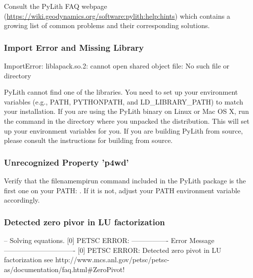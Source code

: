 Consult the PyLith FAQ webpage (\url{https://wiki.geodynamics.org/software:pylith:help:hints})
which contains a growing list of common problems and their corresponding
solutions.

\subsubsection{Import Error and Missing Library}
\begin{shell}
ImportError: liblapack.so.2: cannot open shared object file: No such file or directory
\end{shell}

PyLith cannot find one of the libraries. You need to set up your environment
variables (e.g., PATH, PYTHONPATH, and LD\_LIBRARY\_PATH) to match
your installation. If you are using the PyLith binary on Linux or
Mac OS X, run the command in the directory
where you unpacked the distribution. This will set up your environment
variables for you. If you are building PyLith from source, please
consult the instructions for building from source.

\subsubsection{Unrecognized Property 'p4wd'}

\begin{shell}
-- pyre.inventory(error) } \\
-- p4wd <- 'true' } \\
-- unrecognized property 'p4wd' } \\
>> command line:: } \\
-- pyre.inventory(error) } \\
-- p4pg <- 'true' } \\
-- unrecognized property ' p4pg'}
\end{shell}
Verify that the filename{mpirun} command included in the PyLith package is
the first one on your PATH: . If it is not, adjust your PATH environment variable accordingly.

\subsubsection{Detected zero pivor in LU factorization}

\begin{shell}
-- Solving equations.
[0] PETSC ERROR: ----------------
Error Message -------------------------------
[0] PETSC ERROR: Detected zero pivot in LU factorization
see http://www.mcs.anl.gov/petsc/petsc-as/documentation/faq.html\#ZeroPivot!
\end{shell}

